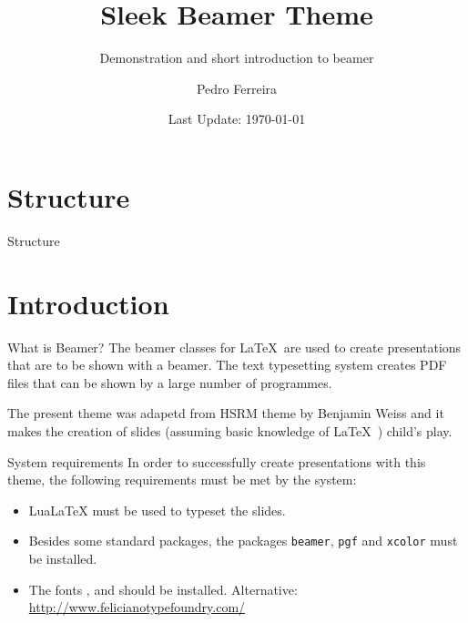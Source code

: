 \documentclass[compress,aspectratio=169]{beamer}
\title{Sleek Beamer Theme}
\subtitle{Demonstration and short introduction to beamer}
\date{Last Update: \today}
\author{Pedro Ferreira}
\institute{DEMEC\\ {\Medium FEUP}}
\begin{document}

\maketitle

\section*{Structure}
\begin{frame}{Structure}
	\tableofcontents[hideallsubsections]
\end{frame}

\section{Introduction}

\begin{frame}{What is Beamer?}
	The beamer classes for \LaTeX\ are used to create presentations that are to be shown with a beamer. The text typesetting system creates PDF files that can be shown by a large number of programmes.
	
	The present theme was adapetd from HSRM theme by Benjamin Weiss and it makes the creation of slides (assuming basic knowledge of \LaTeX\ ) child's play.
\end{frame}

\begin{frame}{System requirements}
	In order to successfully create presentations with this theme, the following requirements must be met by the system:
	\begin{itemize}
		\item LuaLaTeX must be used to typeset the slides.
		\item Besides some standard packages, the packages \texttt{beamer}, \texttt{pgf} and \texttt{xcolor} must be installed.
		\item The fonts ,  and  should be installed. Alternative: \\\url{http://www.felicianotypefoundry.com/}
	\end{itemize}
\end{frame}
\end{document}
